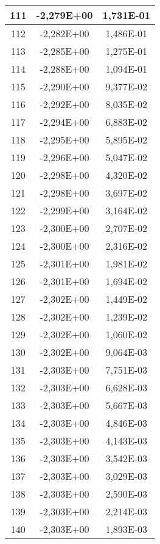 \documentclass[12pt]{article}
\begin{document}
\begin{center}
\begin{longtable}{|c|c|c|}
    111	&     -2,279E+00	&   1,731E-01 \\ \hline
    112	&     -2,282E+00	&   1,486E-01 \\ \hline
    113	&     -2,285E+00	&   1,275E-01 \\ \hline
    114	&     -2,288E+00	&   1,094E-01 \\ \hline
    115	&     -2,290E+00	&   9,377E-02 \\ \hline
    116	&     -2,292E+00	&   8,035E-02 \\ \hline
    117	&     -2,294E+00	&   6,883E-02 \\ \hline
    118	&     -2,295E+00	&   5,895E-02 \\ \hline
    119	&     -2,296E+00	&   5,047E-02 \\ \hline
    120	&     -2,298E+00	&   4,320E-02 \\ \hline
    121	&     -2,298E+00	&   3,697E-02 \\ \hline
    122	&     -2,299E+00	&   3,164E-02 \\ \hline
    123	&     -2,300E+00	&   2,707E-02 \\ \hline
    124	&     -2,300E+00	&   2,316E-02 \\ \hline
    125	&     -2,301E+00	&   1,981E-02 \\ \hline
    126	&     -2,301E+00	&   1,694E-02 \\ \hline
    127	&     -2,302E+00	&   1,449E-02 \\ \hline
    128	&     -2,302E+00	&   1,239E-02 \\ \hline
    129	&     -2,302E+00	&   1,060E-02 \\ \hline
    130	&     -2,302E+00	&   9,064E-03 \\ \hline
    131	&     -2,303E+00	&   7,751E-03 \\ \hline
    132	&     -2,303E+00	&   6,628E-03 \\ \hline
    133	&     -2,303E+00	&   5,667E-03 \\ \hline
    134	&     -2,303E+00	&   4,846E-03 \\ \hline
    135	&     -2,303E+00	&   4,143E-03 \\ \hline
    136	&     -2,303E+00	&   3,542E-03 \\ \hline
    137	&     -2,303E+00	&   3,029E-03 \\ \hline
    138	&     -2,303E+00	&   2,590E-03 \\ \hline
    139	&     -2,303E+00	&   2,214E-03 \\ \hline
    140	&     -2,303E+00	&   1,893E-03 \\ \hline

\end{longtable}
\end{center}
\end{document}
